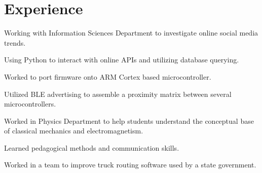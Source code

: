 \documentclass[]{deedy-resume-openfont}
\begin{document}
\begin{minipage}[t]{0.59\textwidth} 

\section{Experience}

\begin{tightemize}
\vspace*{1.2\topsep}
\item Working with Information Sciences Department to investigate online social media trends.
\item Using Python to interact with online APIs and utilizing
database querying.
\end{tightemize}
\sectionsep

\begin{tightemize}
\item Worked to port firmware onto ARM Cortex based microcontroller.
\item Utilized BLE advertising to assemble a proximity matrix between several microcontrollers.
\end{tightemize}
\sectionsep

\begin{tightemize}
\item Worked in Physics Department to help students understand the conceptual base of classical mechanics and electromagnetism.
\item Learned pedagogical methods and communication skills.
\end{tightemize}
\sectionsep

\begin{tightemize}
\item Worked in a team to improve truck routing software used by a state government.
\end{tightemize}
\sectionsep


\end{minipage}
\end{document}

